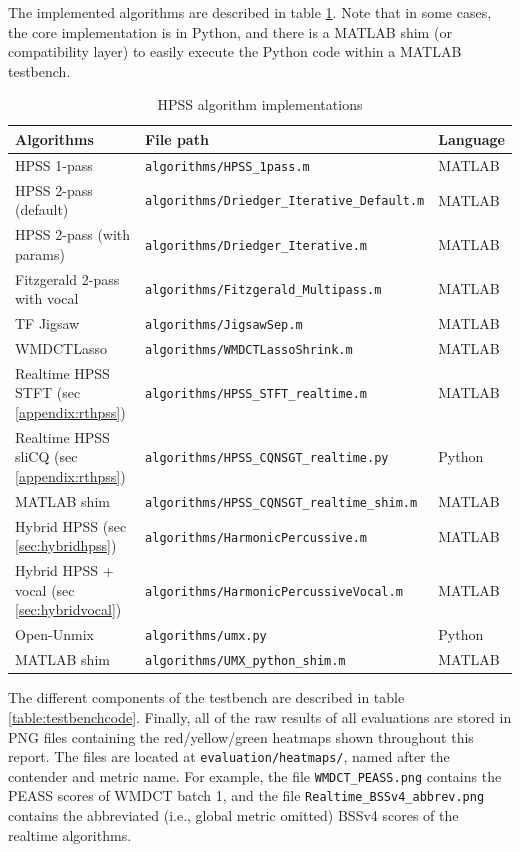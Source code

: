 \documentclass[letter,12pt]{article}
\begin{document}
\begin{appendices}
The implemented algorithms are described in table \ref{table:algos}. Note that in some cases, the core implementation is in Python, and there is a MATLAB shim (or compatibility layer) to easily execute the Python code within a MATLAB testbench.

\begin{table}[ht]
	\centering
\begin{tabular}{ |l|l|l| }
	 \hline
	  Algorithms & File path & Language \\
	 \hline
	 \hline
	 HPSS 1-pass \cite{fitzgerald1, driedger} & \Verb#algorithms/HPSS_1pass.m# & MATLAB \\
	 \hline
	 HPSS 2-pass (default) \cite{driedger} & \Verb#algorithms/Driedger_Iterative_Default.m# & MATLAB \\
	 \hline
	 HPSS 2-pass (with params) \cite{driedger} & \Verb#algorithms/Driedger_Iterative.m# & MATLAB \\
	 \hline
	 Fitzgerald 2-pass with vocal \cite{fitzgerald2} & \Verb#algorithms/Fitzgerald_Multipass.m# & MATLAB \\
	 \hline
	 TF Jigsaw \cite{tfjigsaw} & \Verb#algorithms/JigsawSep.m# & MATLAB \\
	 \hline
	 WMDCTLasso \cite{wmdct} & \Verb#algorithms/WMDCTLassoShrink.m# & MATLAB \\
	 \hline
	 Realtime HPSS STFT (sec \ref{appendix:rthpss}) & \Verb#algorithms/HPSS_STFT_realtime.m# & MATLAB \\
	 \hline
	 Realtime HPSS sliCQ (sec \ref{appendix:rthpss}) & \Verb#algorithms/HPSS_CQNSGT_realtime.py# & Python \\
	 MATLAB shim & \Verb#algorithms/HPSS_CQNSGT_realtime_shim.m# & MATLAB \\
	 \hline
	 Hybrid HPSS (sec \ref{sec:hybridhpss}) & \Verb#algorithms/HarmonicPercussive.m# & MATLAB \\
	 \hline
	 Hybrid HPSS + vocal (sec \ref{sec:hybridvocal}) & \Verb#algorithms/HarmonicPercussiveVocal.m# & MATLAB \\
	 \hline
	 Open-Unmix & \Verb#algorithms/umx.py# & Python \\
	 MATLAB shim & \Verb#algorithms/UMX_python_shim.m# & MATLAB \\
	 \hline
\end{tabular}
	\caption{HPSS algorithm implementations}
	\label{table:algos}
\end{table}

The different components of the testbench are described in table \ref{table:testbenchcode}. Finally, all of the raw results of all evaluations are stored in PNG files containing the red/yellow/green heatmaps shown throughout this report. The files are located at \Verb#evaluation/heatmaps/#, named after the contender and metric name. For example, the file \Verb#WMDCT_PEASS.png# contains the PEASS scores of WMDCT batch 1, and the file \Verb#Realtime_BSSv4_abbrev.png# contains the abbreviated (i.e., global metric omitted) BSSv4 scores of the realtime algorithms.


\end{appendices}
\end{document}
